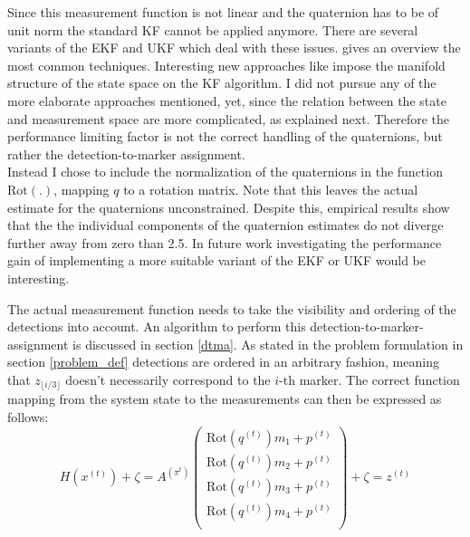 \documentclass{article}
\begin{document}
Since this measurement function is not linear and the quaternion has to be of unit norm the standard KF cannot be applied anymore. There are several variants of the EKF and UKF which deal with these issues. \cite{attitude_estimation} gives an overview the most common techniques. Interesting new approaches like \cite{manifolds} impose the manifold structure of the state space on the KF algorithm. %
I did not pursue any of the more elaborate approaches mentioned, yet, since the relation between the state and measurement space are more complicated, as explained next. Therefore the performance limiting factor is not the correct handling of the quaternions, but rather the detection-to-marker assignment.\\
Instead I chose to include the normalization of the quaternions in the function $\text{Rot}(.)$, mapping $q$ to a rotation matrix. %
 Note that this leaves the actual estimate for the quaternions unconstrained. Despite this, empirical results show that the the individual components of the quaternion estimates do not diverge further away from zero than 2.5. In future work investigating the performance gain of implementing a more suitable variant of the EKF or UKF would be interesting.

The actual measurement function needs to take the visibility and ordering of the detections into account. An algorithm to perform this detection-to-marker-assignment is discussed in section \ref{dtma}.
As stated in the problem formulation in section \ref{problem_def} detections are ordered in an arbitrary fashion, meaning that $z_{\lfloor i / 3 \rfloor}$ doesn't necessarily correspond to the $i\text{-th}$ marker. The correct function mapping from the system state to the measurements can then be expressed as follows:
\begin{equation}
H(x^{(t)}) + \zeta=
A^{(\pi^{t})} \begin{pmatrix}
\text{Rot}(q^{(t)})m_1 + p^{(t)} \\
\text{Rot}(q^{(t)})m_2 + p^{(t)} \\
\text{Rot}(q^{(t)})m_3 + p^{(t)} \\
\text{Rot}(q^{(t)})m_4 + p^{(t)} \\
\end{pmatrix} + \zeta
= z^{(t)} 
\end{equation}
\end{document}
